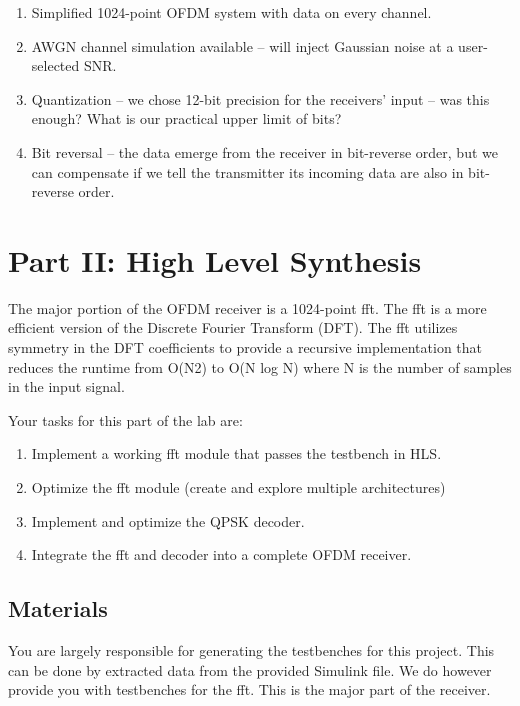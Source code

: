 \begin{enumerate}
\item Simplified 1024-point OFDM system with data on every channel.
\item AWGN channel simulation available -- will inject Gaussian noise at a user-selected SNR.
\item Quantization -- we chose 12-bit precision for the receivers' input -- was this enough? What is our practical upper limit of bits? 
\item Bit reversal -- the data emerge from the receiver in bit-reverse order, but we can compensate if we tell the transmitter its incoming data are also in bit-reverse order.
\end{enumerate}

\section{Part II: High Level Synthesis}
The major portion of the OFDM receiver is a 1024-point \gls{fft}. The \gls{fft} is a more efficient version of the Discrete Fourier Transform (DFT). The \gls{fft} utilizes symmetry in the DFT coefficients to provide a recursive implementation that reduces the runtime from O(N2) to O(N log N) where N is the number of samples in the input signal. 

Your tasks for this part of the lab are: 
\begin{enumerate}
\item Implement a working \gls{fft} module that passes the testbench in HLS.
\item Optimize the \gls{fft} module (create and explore multiple architectures) 
\item Implement and optimize the QPSK decoder.
\item Integrate the \gls{fft} and decoder into a complete OFDM receiver.
\end{enumerate}

\subsection{Materials}

You are largely responsible for generating the testbenches for this project. This can be done by extracted data from the provided Simulink file. We do however provide you with testbenches for the \gls{fft}. This is the major part of the receiver.

